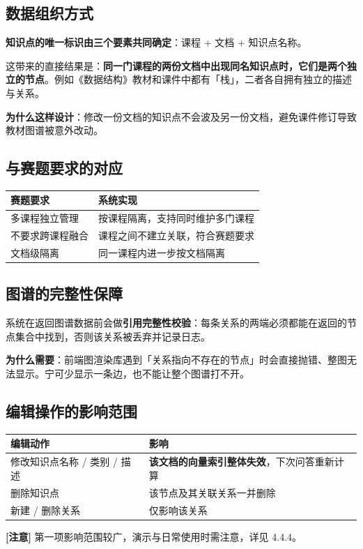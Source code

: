 \documentclass[UTF8,a4paper,11pt]{ctexrep}
\newcommand{\warnmark}{\textcolor{todobar}{\textbf{[注意]}}}
\begin{document}
\subsection{数据组织方式}

\textbf{知识点的唯一标识由三个要素共同确定}：课程 + 文档 + 知识点名称。

这带来的直接结果是：\textbf{同一门课程的两份文档中出现同名知识点时，它们是两个独立的节点}。例如《数据结构》教材和课件中都有「栈」，二者各自拥有独立的描述与关系。

\textbf{为什么这样设计}：修改一份文档的知识点不会波及另一份文档，避免课件修订导致教材图谱被意外改动。


\subsection{与赛题要求的对应}

\begin{center}
\small
\begin{tabularx}{\linewidth}{@{}XX@{}}
\toprule
赛题要求 & 系统实现 \\
\midrule
多课程独立管理 & 按课程隔离，支持同时维护多门课程 \\
不要求跨课程融合 & 课程之间不建立关联，符合赛题要求 \\
文档级隔离 & 同一课程内进一步按文档隔离 \\
\bottomrule
\end{tabularx}
\end{center}

\subsection{图谱的完整性保障}

系统在返回图谱数据前会做\textbf{引用完整性校验}：每条关系的两端必须都能在返回的节点集合中找到，否则该关系被丢弃并记录日志。

\textbf{为什么需要}：前端图渲染库遇到「关系指向不存在的节点」时会直接抛错、整图无法显示。宁可少显示一条边，也不能让整个图谱打不开。


\subsection{编辑操作的影响范围}

\begin{center}
\small
\begin{tabularx}{\linewidth}{@{}XX@{}}
\toprule
编辑动作 & 影响 \\
\midrule
修改知识点名称 / 类别 / 描述 & \textbf{该文档的向量索引整体失效}，下次问答重新计算 \\
删除知识点 & 该节点及其关联关系一并删除 \\
新建 / 删除关系 & 仅影响该关系 \\
\bottomrule
\end{tabularx}
\end{center}
\begin{todobox}
\warnmark{} 第一项影响范围较广，演示与日常使用时需注意，详见 4.4.4。

\end{todobox}
\end{document}
